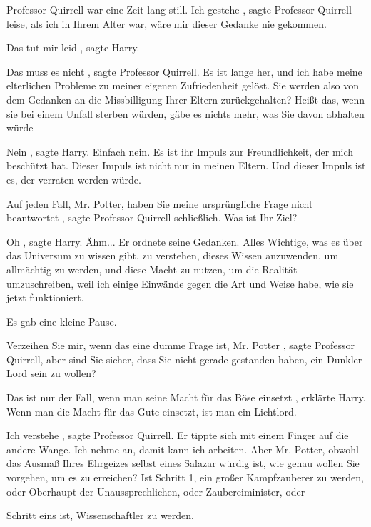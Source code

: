 Professor Quirrell war eine Zeit lang still. \glqq Ich gestehe\grqq{} , sagte
Professor Quirrell leise, \glqq als ich in Ihrem Alter war, wäre mir dieser
Gedanke nie gekommen.\grqq{}

\glqq Das tut mir leid\grqq{} , sagte Harry.

\glqq Das muss es nicht\grqq{} , sagte Professor Quirrell. \glqq Es ist lange
her, und ich habe meine elterlichen Probleme zu meiner eigenen Zufriedenheit
gelöst. Sie werden also von dem Gedanken an die Missbilligung Ihrer Eltern
zurückgehalten? Heißt das, wenn sie bei einem Unfall sterben würden, gäbe es
nichts mehr, was Sie davon abhalten würde -\grqq{}

\glqq Nein\grqq{} , sagte Harry. \glqq Einfach nein. Es ist ihr Impuls zur
Freundlichkeit, der mich beschützt hat. Dieser Impuls ist nicht nur in meinen
Eltern. Und dieser Impuls ist es, der verraten werden würde.\grqq{}

\glqq Auf jeden Fall, Mr. Potter, haben Sie meine ursprüngliche Frage nicht
beantwortet\grqq{} , sagte Professor Quirrell schließlich. \glqq Was ist Ihr
Ziel?\grqq{}

\glqq Oh\grqq{} , sagte Harry. \glqq Ähm...\grqq{} Er ordnete seine Gedanken.
\glqq Alles Wichtige, was es über das Universum zu wissen gibt, zu verstehen,
dieses Wissen anzuwenden, um allmächtig zu werden, und diese Macht zu nutzen, um
die Realität umzuschreiben, weil ich einige Einwände gegen die Art und Weise
habe, wie sie jetzt funktioniert.\grqq{}

Es gab eine kleine Pause.

\glqq Verzeihen Sie mir, wenn das eine dumme Frage ist, Mr. Potter\grqq{} ,
sagte Professor Quirrell, \glqq aber sind Sie sicher, dass Sie nicht gerade
gestanden haben, ein Dunkler Lord sein zu wollen?\grqq{}

\glqq Das ist nur der Fall, wenn man seine Macht für das Böse einsetzt\grqq{} ,
erklärte Harry. \glqq Wenn man die Macht für das Gute einsetzt, ist man ein
Lichtlord.\grqq{}

\glqq Ich verstehe\grqq{} , sagte Professor Quirrell. Er tippte sich mit einem
Finger auf die andere Wange. \glqq Ich nehme an, damit kann ich arbeiten. Aber
Mr. Potter, obwohl das Ausmaß Ihres Ehrgeizes selbst eines Salazar würdig ist,
wie genau wollen Sie vorgehen, um es zu erreichen? Ist Schritt 1, ein großer
Kampfzauberer zu werden, oder Oberhaupt der Unaussprechlichen, oder
Zaubereiminister, oder -\grqq{}

\glqq Schritt eins ist, Wissenschaftler zu werden.\grqq{}

